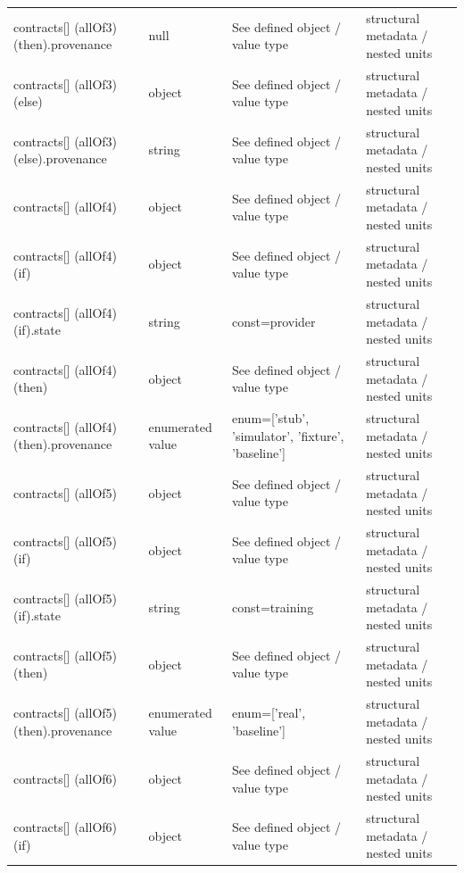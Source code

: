 \begin{longtable}{@{}>{\raggedright\arraybackslash}p{}>{\raggedright\arraybackslash}p{}>{\raggedright\arraybackslash}p{}>{\raggedright\arraybackslash}p{}@{}}
contracts[] (allOf3) (then).\allowbreak{}provenance & null & See defined object /\allowbreak{} value type & structural metadata /\allowbreak{} nested units\\
contracts[] (allOf3) (else) & object & See defined object /\allowbreak{} value type & structural metadata /\allowbreak{} nested units\\
contracts[] (allOf3) (else).\allowbreak{}provenance & string & See defined object /\allowbreak{} value type & structural metadata /\allowbreak{} nested units\\
contracts[] (allOf4) & object & See defined object /\allowbreak{} value type & structural metadata /\allowbreak{} nested units\\
contracts[] (allOf4) (if) & object & See defined object /\allowbreak{} value type & structural metadata /\allowbreak{} nested units\\
contracts[] (allOf4) (if).\allowbreak{}state & string & const=\allowbreak{}provider & structural metadata /\allowbreak{} nested units\\
contracts[] (allOf4) (then) & object & See defined object /\allowbreak{} value type & structural metadata /\allowbreak{} nested units\\
contracts[] (allOf4) (then).\allowbreak{}provenance & enumerated value & enum=\allowbreak{}['stub', 'simulator', 'fixture', 'baseline'] & structural metadata /\allowbreak{} nested units\\
contracts[] (allOf5) & object & See defined object /\allowbreak{} value type & structural metadata /\allowbreak{} nested units\\
contracts[] (allOf5) (if) & object & See defined object /\allowbreak{} value type & structural metadata /\allowbreak{} nested units\\
contracts[] (allOf5) (if).\allowbreak{}state & string & const=\allowbreak{}training & structural metadata /\allowbreak{} nested units\\
contracts[] (allOf5) (then) & object & See defined object /\allowbreak{} value type & structural metadata /\allowbreak{} nested units\\
contracts[] (allOf5) (then).\allowbreak{}provenance & enumerated value & enum=\allowbreak{}['real', 'baseline'] & structural metadata /\allowbreak{} nested units\\
contracts[] (allOf6) & object & See defined object /\allowbreak{} value type & structural metadata /\allowbreak{} nested units\\
contracts[] (allOf6) (if) & object & See defined object /\allowbreak{} value type & structural metadata /\allowbreak{} nested units\\

\end{longtable}
